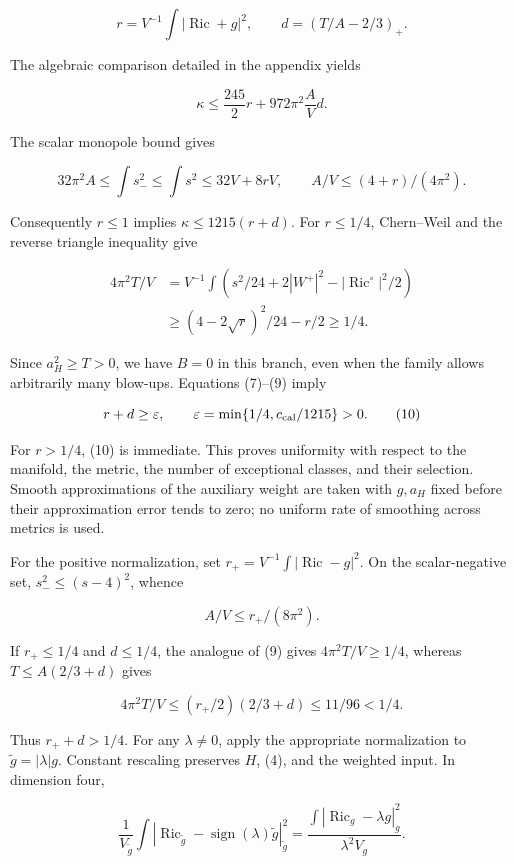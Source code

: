 \documentclass[
  11pt,
]{article}
\begin{document}
\[
r=V^{-1}\int|\operatorname{Ric}+g|^2,\qquad
d=(T/A-2/3)_+.
\]

The algebraic comparison detailed in the appendix yields

\[
\kappa\le\frac{245}{2}r+972\pi^2\frac AVd.              \tag{8}
\]

The scalar monopole bound gives

\[
32\pi^2A\le\int s_-^2\le\int s^2\le32V+8rV,
\qquad A/V\le(4+r)/(4\pi^2).
\]

Consequently \(r\le1\) implies \(\kappa\le1215(r+d)\). For \(r\le1/4\),
Chern--Weil and the reverse triangle inequality give

\[
\begin{split}
4\pi^2T/V
&=V^{-1}\int\left(s^2/24+2|W^+|^2
                    -|\operatorname{Ric}^{\circ}|^2/2\right)\\
&\ge(4-2\sqrt r)^2/24-r/2\ge1/4.
\end{split}                                           \tag{9}
\]

Since \(a_H^2\ge T>0\), we have \(B=0\) in this branch, even when the
family allows arbitrarily many blow-ups. Equations (7)--(9) imply

\[
r+d\ge\varepsilon,\qquad
\varepsilon=\min\{1/4,c_{\rm cal}/1215\}>0.             \tag{10}
\]

For \(r>1/4\), (10) is immediate. This proves uniformity with respect to
the manifold, the metric, the number of exceptional classes, and their
selection. Smooth approximations of the auxiliary weight are taken with
\(g,a_H\) fixed before their approximation error tends to zero; no
uniform rate of smoothing across metrics is used.

For the positive normalization, set
\(r_+=V^{-1}\int|\operatorname{Ric}-g|^2\). On the scalar-negative set,
\(s_-^2\le(s-4)^2\), whence

\[
A/V\le r_+/(8\pi^2).
\]

If \(r_+\le1/4\) and \(d\le1/4\), the analogue of (9) gives
\(4\pi^2T/V\ge1/4\), whereas \(T\le A(2/3+d)\) gives

\[
4\pi^2T/V\le(r_+/2)(2/3+d)\le11/96<1/4.
\]

Thus \(r_++d>1/4\). For any \(\lambda\ne0\), apply the appropriate
normalization to \(\widetilde g=|\lambda|g\). Constant rescaling
preserves \(H\), (4), and the weighted input. In dimension four,

\[
\frac1{V_{\widetilde g}}\int
 |\operatorname{Ric}_{\widetilde g}-\operatorname{sign}(\lambda)
             \widetilde g|_{\widetilde g}^2
=\frac{\int|\operatorname{Ric}_g-\lambda g|_g^2}{\lambda^2V_g}.
\]
\end{document}
